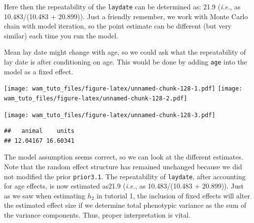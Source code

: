 \documentclass[
  12pt,
]{book}
\newenvironment{Shaded}{\begin{snugshade}}{\end{snugshade}}
\newcommand{\DataTypeTok}[1]{\textcolor[rgb]{0.13,0.29,0.53}{#1}}
\newcommand{\FloatTok}[1]{\textcolor[rgb]{0.00,0.00,0.81}{#1}}
\newcommand{\KeywordTok}[1]{\textcolor[rgb]{0.13,0.29,0.53}{\textbf{#1}}}
\newcommand{\NormalTok}[1]{#1}
\newcommand{\OperatorTok}[1]{\textcolor[rgb]{0.81,0.36,0.00}{\textbf{#1}}}
\newcommand{\OtherTok}[1]{\textcolor[rgb]{0.56,0.35,0.01}{#1}}
\newcommand{\StringTok}[1]{\textcolor[rgb]{0.31,0.60,0.02}{#1}}
\begin{document}
Here then the repeatability of the \texttt{laydate} can be determined as: 21.9 (\emph{i.e.}, as 10.483/(10.483 + 20.899)). Just a friendly remember, we work with Monte Carlo chain with model iteration, so the point estimate can be different (but very similar) each time you run the model.

Mean lay date might change with age, so we could ask what the repeatability of lay date is after conditioning on age. This would be done by adding \texttt{age} into the model as a fixed effect.

\begin{Shaded}
\end{Shaded}

\texttt{[image: wam\_tuto\_files/figure-latex/unnamed-chunk-128-1.pdf]} \texttt{[image: wam\_tuto\_files/figure-latex/unnamed-chunk-128-2.pdf]}

\begin{Shaded}
\end{Shaded}

\texttt{[image: wam\_tuto\_files/figure-latex/unnamed-chunk-128-3.pdf]}

\begin{Shaded}
\end{Shaded}

\begin{verbatim}
##   animal    units 
## 12.04167 16.60341
\end{verbatim}

The model assumption seems correct, so we can look at the different estimates.
Note that the random effect structure has remained unchanged because we did not modified the prior \texttt{prior3.1}.
The repeatability of \texttt{laydate}, after accounting for age effects, is now estimated as21.9 (\emph{i.e.}, as 10.483/(10.483 + 20.899)).
Just as we saw when estimating \(h_2\) in tutorial 1, the inclusion of fixed effects will alter the estimated effect size if we determine total phenotypic variance as the sum of the variance components. Thus, proper interpretation is vital.
\end{document}
